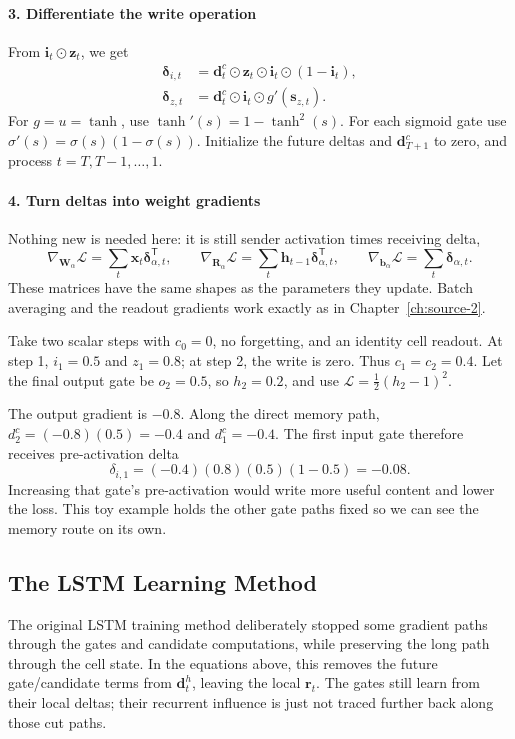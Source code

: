 \documentclass[11pt, oneside]{book}
\newcommand{\T}{^{\mathsf{T}}}           %
\newcommand{\loss}{\mathcal{L}}          %
\newcommand{\params}{\boldsymbol{\theta}}   %
\let\originalsubsection\subsection
\renewcommand{\subsection}{\Needspace{6\baselineskip}\originalsubsection}
\begin{document}
\paragraph{3. Differentiate the write operation} From $\mathbf{i}_t\odot\mathbf{z}_t$, we get
\begin{align}
 \boldsymbol{\delta}_{i,t}
   &=\mathbf{d}^c_t\odot\mathbf{z}_t\odot\mathbf{i}_t\odot(1-\mathbf{i}_t),\\
 \boldsymbol{\delta}_{z,t}
   &=\mathbf{d}^c_t\odot\mathbf{i}_t\odot g'(\mathbf{s}_{z,t}).
\end{align}
For $g=u=\tanh$, use $\tanh'(s)=1-\tanh^2(s)$. For each sigmoid gate use $\sigma'(s)=\sigma(s)(1-\sigma(s))$. Initialize the future deltas and $\mathbf{d}^c_{T+1}$ to zero, and process $t=T,T-1,\ldots,1$.

\paragraph{4. Turn deltas into weight gradients} Nothing new is needed here: it is still sender activation times receiving delta,
\[
 \nabla_{\mathbf{W}_\alpha}\loss
   =\sum_t\mathbf{x}_t\boldsymbol{\delta}_{\alpha,t}\T,\qquad
 \nabla_{\mathbf{R}_\alpha}\loss
   =\sum_t\mathbf{h}_{t-1}\boldsymbol{\delta}_{\alpha,t}\T,\qquad
 \nabla_{\mathbf{b}_\alpha}\loss=\sum_t\boldsymbol{\delta}_{\alpha,t}.
\]
These matrices have the same shapes as the parameters they update. Batch averaging and the readout gradients work exactly as in Chapter~\ref{ch:source-2}.

\begin{exbox}[title={A later loss can teach an earlier write}]
Take two scalar steps with $c_0=0$, no forgetting, and an identity cell readout. At step 1, $i_1=0.5$ and $z_1=0.8$; at step 2, the write is zero. Thus $c_1=c_2=0.4$. Let the final output gate be $o_2=0.5$, so $h_2=0.2$, and use $\loss=\tfrac12(h_2-1)^2$.

The output gradient is $-0.8$. Along the direct memory path, $d^c_2=(-0.8)(0.5)=-0.4$ and $d^c_1=-0.4$. The first input gate therefore receives pre-activation delta
\[
 \delta_{i,1}=(-0.4)(0.8)(0.5)(1-0.5)=-0.08.
\]
Increasing that gate's pre-activation would write more useful content and lower the loss. This toy example holds the other gate paths fixed so we can see the memory route on its own.
\end{exbox}

\subsection{The LSTM Learning Method}\label{sec:source-3-1-1}
The original LSTM training method deliberately stopped some gradient paths through the gates and candidate computations, while preserving the long path through the cell state. In the equations above, this removes the future gate/candidate terms from $\mathbf{d}^h_t$, leaving the local $\mathbf{r}_t$. The gates still learn from their local deltas; their recurrent influence is just not traced further back along those cut paths.
\end{document}
